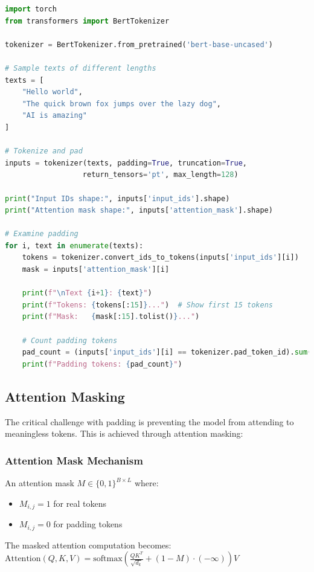 \begin{lstlisting}[language=Python, caption=Padding Implementation]
import torch
from transformers import BertTokenizer

tokenizer = BertTokenizer.from_pretrained('bert-base-uncased')

# Sample texts of different lengths
texts = [
    "Hello world",
    "The quick brown fox jumps over the lazy dog",
    "AI is amazing"
]

# Tokenize and pad
inputs = tokenizer(texts, padding=True, truncation=True, 
                  return_tensors='pt', max_length=128)

print("Input IDs shape:", inputs['input_ids'].shape)
print("Attention mask shape:", inputs['attention_mask'].shape)

# Examine padding
for i, text in enumerate(texts):
    tokens = tokenizer.convert_ids_to_tokens(inputs['input_ids'][i])
    mask = inputs['attention_mask'][i]
    
    print(f"\nText {i+1}: {text}")
    print(f"Tokens: {tokens[:15]}...")  # Show first 15 tokens
    print(f"Mask:   {mask[:15].tolist()}...")
    
    # Count padding tokens
    pad_count = (inputs['input_ids'][i] == tokenizer.pad_token_id).sum()
    print(f"Padding tokens: {pad_count}")
\end{lstlisting}

\subsection{Attention Masking}

The critical challenge with padding is preventing the model from attending to meaningless \pad{} tokens. This is achieved through attention masking:

\subsubsection{Attention Mask Mechanism}
An attention mask $M \in \{0, 1\}^{B \times L}$ where:
\begin{itemize}
\item $M_{i,j} = 1$ for real tokens
\item $M_{i,j} = 0$ for padding tokens
\end{itemize}

The masked attention computation becomes:\\
$\text{Attention}(Q, K, V) = \text{softmax}\left(\frac{QK^T}{\sqrt{d_k}} + (1-M) \cdot (-\infty)\right)V$

